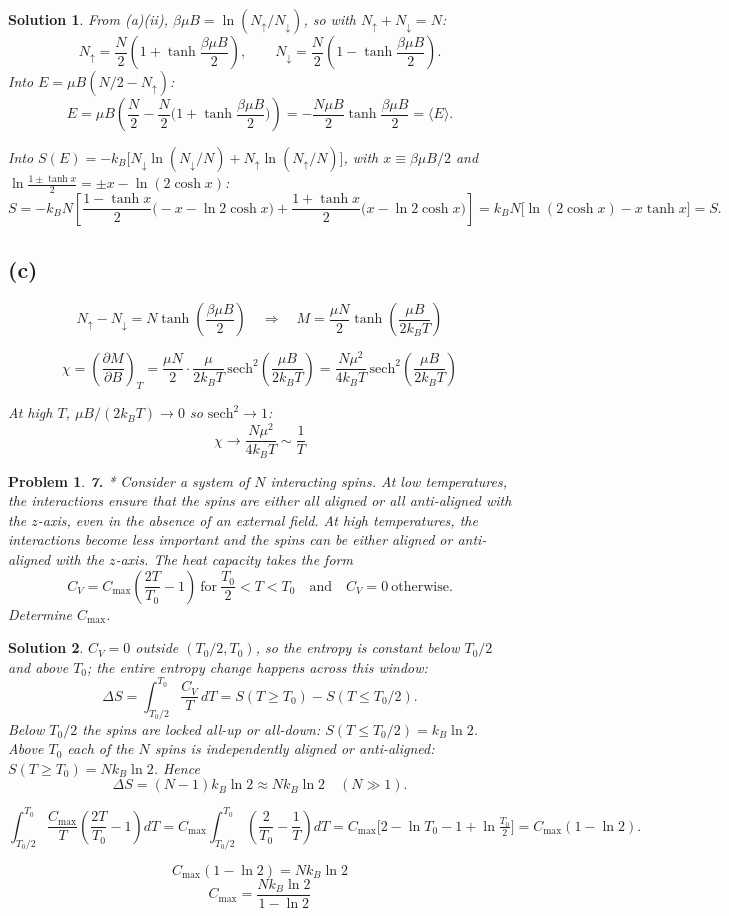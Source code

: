 \documentclass[11pt]{article}
\newtheorem*{problem}{Problem}
\newtheorem*{solution}{Solution}
\begin{document}
\begin{solution}
From (a)(ii), $\beta\mu B=\ln(N_\uparrow/N_\downarrow)$, so with $N_\uparrow+N_\downarrow=N$:
\[
N_\uparrow=\frac{N}{2}\left(1+\tanh\frac{\beta\mu B}{2}\right),
\qquad
N_\downarrow=\frac{N}{2}\left(1-\tanh\frac{\beta\mu B}{2}\right).
\]
Into $E=\mu B(N/2-N_\uparrow)$:
\[
E=\mu B\left(\frac N2-\frac N2\Big(1+\tanh\frac{\beta\mu B}{2}\Big)\right)
=-\frac{N\mu B}{2}\tanh\frac{\beta\mu B}{2}=\langle E\rangle.
\]

Into $S(E)=-k_B\big[N_\downarrow\ln(N_\downarrow/N)+N_\uparrow\ln(N_\uparrow/N)\big]$, with $x\equiv\beta\mu B/2$ and
$\ln\!\frac{1\pm\tanh x}{2}=\pm x-\ln(2\cosh x)$:
\[
S=-k_BN\left[\frac{1-\tanh x}{2}\big(-x-\ln2\cosh x\big)+\frac{1+\tanh x}{2}\big(x-\ln2\cosh x\big)\right]
=k_BN\big[\ln(2\cosh x)-x\tanh x\big]=S.
\]

\subsection*{(c)}
\[
N_\uparrow-N_\downarrow=N\tanh\!\left(\frac{\beta\mu B}{2}\right)
\quad\Rightarrow\quad
\boxed{M=\frac{\mu N}{2}\tanh\!\left(\frac{\mu B}{2k_BT}\right)}
\]

\[
\chi=\left(\frac{\partial M}{\partial B}\right)_T
=\frac{\mu N}{2}\cdot\frac{\mu}{2k_BT}\,\text{sech}^2\!\left(\frac{\mu B}{2k_BT}\right)
=\boxed{\frac{N\mu^2}{4k_BT}\,\text{sech}^2\!\left(\frac{\mu B}{2k_BT}\right)}
\]

At high $T$, $\mu B/(2k_BT)\to0$ so $\text{sech}^2\to1$:
\[
\boxed{\chi\to\frac{N\mu^2}{4k_BT}\sim\frac1T}
\]
\end{solution}

\begin{problem}
\textbf{7.} * Consider a system of $N$ interacting spins. At low temperatures, the interactions
ensure that the spins are either all aligned or all anti-aligned with the $z$-axis, even in the
absence of an external field. At high temperatures, the interactions become less important and
the spins can be either aligned or anti-aligned with the $z$-axis. The heat capacity takes the
form
\[
C_V=C_{\max}\left(\frac{2T}{T_0}-1\right)\ \text{for}\ \frac{T_0}{2}<T<T_0\quad\text{and}\quad C_V=0\ \text{otherwise}.
\]
Determine $C_{\max}$.
\end{problem}

\begin{solution}
$C_V=0$ outside $(T_0/2,T_0)$, so the entropy is constant below $T_0/2$ and above $T_0$; the
entire entropy change happens across this window:
\[
\Delta S=\int_{T_0/2}^{T_0}\frac{C_V}{T}\,dT=S(T\ge T_0)-S(T\le T_0/2).
\]
Below $T_0/2$ the spins are locked all-up or all-down: $S(T\le T_0/2)=k_B\ln2$. Above $T_0$
each of the $N$ spins is independently aligned or anti-aligned: $S(T\ge T_0)=Nk_B\ln2$. Hence
\[
\Delta S=(N-1)k_B\ln2\approx Nk_B\ln2 \quad (N\gg1).
\]

\[
\int_{T_0/2}^{T_0}\frac{C_{\max}}{T}\left(\frac{2T}{T_0}-1\right)dT
=C_{\max}\int_{T_0/2}^{T_0}\left(\frac{2}{T_0}-\frac1T\right)dT
=C_{\max}\Big[2-\ln T_0-1+\ln\tfrac{T_0}{2}\Big]
=C_{\max}(1-\ln2).
\]

\[
C_{\max}(1-\ln2)=Nk_B\ln2
\]
\[
\boxed{C_{\max}=\frac{Nk_B\ln2}{1-\ln2}}
\]
\end{solution}
\end{document}
